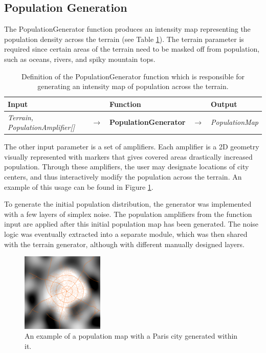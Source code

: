 \subsection{Population Generation}

The PopulationGenerator function produces an intensity map representing the population density across the terrain (see Table \ref{table:popgen}).
The terrain parameter is required since certain areas of the terrain need to be masked off from population, such as oceans, rivers, and spiky mountain tops.
\begin{table}[H]
  \centering
  \begin{tabular}{lllll}
    \textbf{Input}                           &               & \textbf{Function}            &               & \textbf{Output}         \\
    \midrule
    \textit{Terrain, PopulationAmplifier[]}      & $\rightarrow$ & \textbf{PopulationGenerator}      & $\rightarrow$ & \textit{PopulationMap}        \\
    \bottomrule
  \end{tabular}

  \caption{Definition of the PopulationGenerator function which is responsible for generating an intensity map of population across the terrain.}
  \label{table:popgen}
\end{table}
\vspace{-0.4cm} %

The other input parameter is a set of amplifiers.
Each amplifier is a 2D geometry visually represented with markers that gives covered areas drastically increased population.
Through these amplifiers, the user may designate locations of city centers, and thus interactively modify the population across the terrain.
An example of this usage can be found in Figure \ref{fig:pop_dens}.

To generate the initial population distribution, the generator was implemented with a few layers of simplex noise.
The population amplifiers from the function input are applied after this initial population map has been generated.
The noise logic was eventually extracted into a separate module, which was then shared with the terrain generator, although with different manually designed layers.

\begin{figure}[h!]
  \centering
  \includegraphics[width=0.35\textwidth]{figure/pop_density.png}
  \caption{An example of a population map with a Paris city generated within it.}
  \label{fig:pop_dens}
\end{figure}